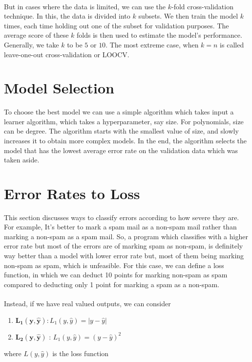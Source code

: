\documentclass{article}
\begin{document}
\paragraph{}
  But in cases where the data is limited, we can use the $k$-fold cross-validation technique. 
  In this, the data is divided into $k$ subsets. 
  We then train the model $k$ times, each time holding out one of the subset for validation purposes. 
  The average score of these $k$ folds is then used to estimate the model’s performance. 
  Generally, we take $k$ to be $5$ or $10$. 
  The most extreme case, when $k=n$ is called leave-one-out cross-validation or LOOCV.

\section*{Model Selection}
  \paragraph{}
    To choose the best model we can use a simple algorithm which takes input a learner algorithm, which takes a hyperparameter, say size. 
    For polynomials, size can be degree. 
    The algorithm starts with the smallest value of size, and slowly increases it to obtain more complex models. 
    In the end, the algorithm selects the model that has the lowest average error rate on the validation data which was taken aside. 

\section*{Error Rates to Loss}
  \paragraph{}
    This section discusses ways to classify errors according to how severe they are. 
    For example, It’s better to mark a spam mail as a non-spam mail rather than marking a non-spam as a spam mail. 
    So, a program which classifies with a higher error rate but most of the errors are of marking spam as non-spam, is definitely way better than a model with lower error rate but, most of them being marking non-spam as spam, which is unfeasible. 
    For this case, we can define a loss function, in which we can deduct 10 points for marking non-spam as spam compared to deducting only 1 point for marking a spam as a non-spam.

  \paragraph{}
    Instead, if we have real valued outputs, we can consider
      \begin{enumerate}
        \item $\mathbf{L_1(y, \hat{y})} : L_1(y, \hat{y}) = |y - \hat{y}|$
        \item $\mathbf{L_2(y, \hat{y})}$ : $L_1(y, \hat{y}) = (y - \hat{y})^2$
      \end{enumerate} 
      where $L(y,\hat{y})$ is the loss function
\end{document}
